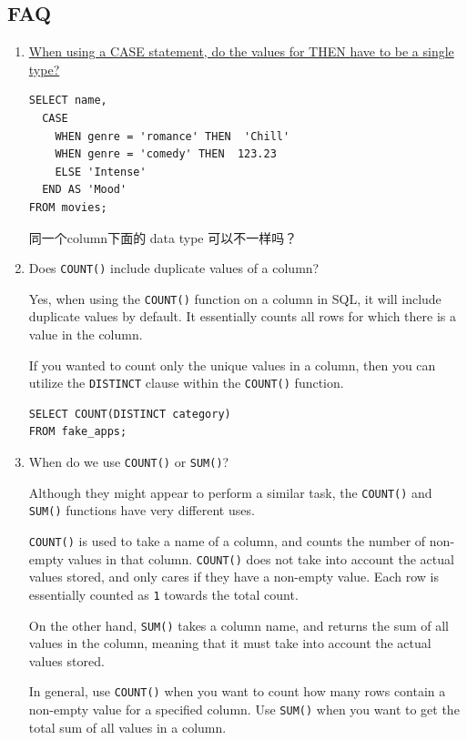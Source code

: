 \documentclass[a4paper, 12pt]{article}
\begin{document}
\subsection{FAQ}
\begin{enumerate}
\item \href{https://discuss.codecademy.com/t/when-using-a-case-statement-do-the-values-for-then-have-to-be-a-single-type/351538}{When using a CASE statement, do the values for THEN have to be a single type?}
\begin{verbatim}
SELECT name,
  CASE
    WHEN genre = 'romance' THEN  'Chill'
    WHEN genre = 'comedy' THEN  123.23
    ELSE 'Intense'
  END AS 'Mood'
FROM movies;
\end{verbatim}
同一个column下面的 data type 可以不一样吗？

\item Does \verb|COUNT()| include duplicate values of a column?

Yes, when using the \verb|COUNT()| function on a column in SQL, it will include duplicate values by default. It essentially counts all rows for which there is a value in the column.

If you wanted to count only the unique values in a column, then you can utilize the \verb|DISTINCT| clause within the \verb|COUNT()| function.
\begin{verbatim}
SELECT COUNT(DISTINCT category)
FROM fake_apps;
\end{verbatim}

\item When do we use \verb|COUNT()| or \verb|SUM()|?

Although they might appear to perform a similar task, the \verb|COUNT()| and \verb|SUM()| functions have very different uses.

\verb|COUNT()| is used to take a name of a column, and counts the number of non-empty values in that column. \verb|COUNT()| does not take into account the actual values stored, and only cares if they have a non-empty value. Each row is essentially counted as \verb|1| towards the total count.

On the other hand, \verb|SUM()| takes a column name, and returns the sum of all values in the column, meaning that it must take into account the actual values stored.

In general, use \verb|COUNT()| when you want to count how many rows contain a non-empty value for a specified column. Use \verb|SUM()| when you want to get the total sum of all values in a column.


\end{enumerate}
\end{document}
